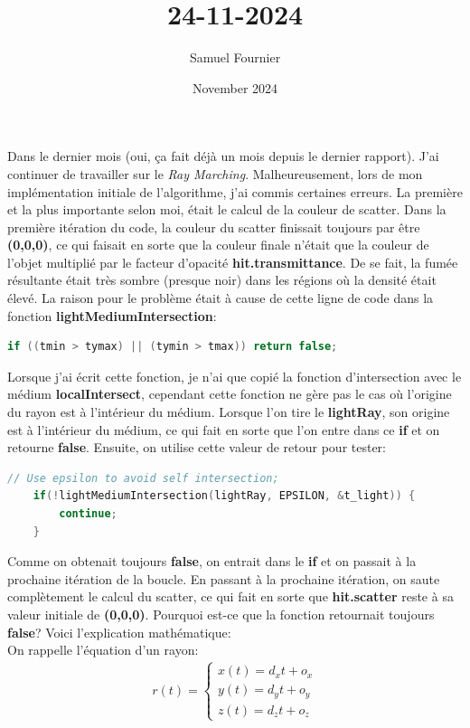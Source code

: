 \documentclass{article}
\title{24-11-2024}
\author{Samuel Fournier}
\date{November 2024}
\begin{document}
\maketitle

Dans le dernier mois (oui, ça fait déjà un mois depuis le dernier rapport). J'ai continuer de travailler sur le \textit{Ray Marching}. Malheureusement, lors de mon implémentation initiale de l'algorithme, j'ai commis certaines erreurs. La première et la plus importante selon moi, était le calcul de la couleur de scatter. Dans la première itération du code, la couleur du scatter finissait toujours par être \textbf{(0,0,0)}, ce qui faisait en sorte que la couleur finale n'était que la couleur de l'objet multiplié par le facteur d'opacité \textbf{hit.transmittance}. De se fait, la fumée résultante était très sombre (presque noir) dans les régions où la densité était élevé. La raison pour le problème était à cause de cette ligne de code dans la fonction \textbf{lightMediumIntersection}:
\begin{lstlisting}[language=C++]
    if ((tmin > tymax) || (tymin > tmax)) return false;
\end{lstlisting}
Lorsque j'ai écrit cette fonction, je n'ai que copié la fonction d'intersection avec le médium \textbf{localIntersect}, cependant cette fonction ne gère pas le cas où l'origine du rayon est à l'intérieur du médium. Lorsque l'on tire le \textbf{lightRay}, son origine est à l'intérieur du médium, ce qui fait en sorte que l'on entre dans ce \textbf{if} et on retourne \textbf{false}. Ensuite, on utilise cette valeur de retour pour tester:
\begin{lstlisting}[language=C++]
    // Use epsilon to avoid self intersection;
    if(!lightMediumIntersection(lightRay, EPSILON, &t_light)) {
        continue;
    }
\end{lstlisting}
Comme on obtenait toujours \textbf{false}, on entrait dans le \textbf{if} et on passait à la prochaine itération de la boucle. En passant à la prochaine itération, on saute complètement le calcul du scatter, ce qui fait en sorte que \textbf{hit.scatter} reste à sa valeur initiale de \textbf{(0,0,0)}. Pourquoi est-ce que la fonction retournait toujours \textbf{false}? Voici l'explication mathématique: \\
On rappelle l'équation d'un rayon:
\begin{align*}
    r(t) = \begin{cases}
        x(t) = d_xt + o_x \\
        y(t) = d_yt + o_y \\
        z(t) = d_zt + o_z
    \end{cases}
\end{align*}
\end{document}
